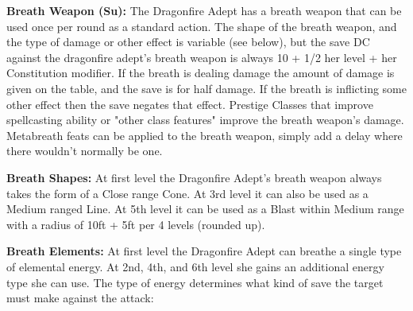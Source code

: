 \modebab{}
\goodfor{}
\goodref{}
\goodwil{}

\begin{extraclasstable}{}
\end{extraclasstable}

\classfeatures

\textbf{Breath Weapon (Su):} The Dragonfire Adept has a breath weapon that can be used once per round as a standard action. The shape of the breath weapon, and the type of damage or other effect is variable (see below), but the save DC against the dragonfire adept's breath weapon is always 10 + 1/2 her level + her Constitution modifier. If the breath is dealing damage the amount of damage is given on the table, and the save is for half damage. If the breath is inflicting some other effect then the save negates that effect. Prestige Classes that improve spellcasting ability or "other class features" improve the breath weapon's damage. Metabreath feats can be applied to the breath weapon, simply add a delay where there wouldn't normally be one.

\textbf{Breath Shapes:} At first level the Dragonfire Adept's breath weapon always takes the form of a Close range Cone. At 3rd level it can also be used as a Medium ranged Line. At 5th level it can be used as a Blast within Medium range with a radius of 10ft + 5ft per 4 levels (rounded up).

\textbf{Breath Elements:} At first level the Dragonfire Adept can breathe a single type of elemental energy. At 2nd, 4th, and 6th level she gains an additional energy type she can use. The type of energy determines what kind of save the target must make against the attack:

